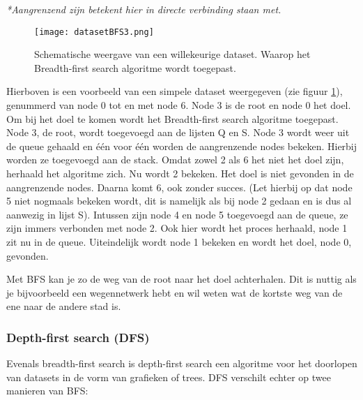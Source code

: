 \textit{*Aangrenzend zijn betekent hier \textit{in directe verbinding staan met}.}

\begin{figure}[h]
  \centering
    \texttt{[image: datasetBFS3.png]}
  \caption{Schematische weergave van een willekeurige dataset. Waarop het Breadth-first search algoritme wordt toegepast.}
  \label{fig:datasetBFS3}
\end{figure}
Hierboven is een voorbeeld van een simpele dataset weergegeven (zie figuur \ref{fig:datasetBFS3}), genummerd van node 0 tot en met node 6. Node 3 is de root en node 0 het doel. Om bij het doel te komen wordt het Breadth-first search algoritme toegepast. Node 3, de root, wordt toegevoegd aan de lijsten Q en S. Node 3 wordt weer uit de queue gehaald en \'e\'en voor \'e\'en worden de aangrenzende nodes bekeken. Hierbij worden ze toegevoegd aan de stack. Omdat zowel 2 als 6 het niet het doel zijn, herhaald het algoritme zich. Nu wordt 2 bekeken. Het doel is niet gevonden in de aangrenzende nodes. Daarna komt 6, ook zonder succes. (Let hierbij op dat node 5 niet nogmaals bekeken wordt, dit is namelijk als bij node 2 gedaan en is dus al aanwezig in lijst S). Intussen zijn node 4 en node 5 toegevoegd aan de queue, ze zijn immers verbonden met node 2. Ook hier wordt het proces herhaald, node 1 zit nu in de queue. Uiteindelijk wordt node 1 bekeken en wordt het doel, node 0, gevonden.

Met BFS kan je zo de weg van de root naar het doel achterhalen. Dit is nuttig als je bijvoorbeeld een wegennetwerk hebt en wil weten wat de kortste weg van de ene naar de andere stad is.


\subsubsection{Depth-first search (DFS)}
Evenals breadth-first search is depth-first search een algoritme voor het doorlopen van datasets in de vorm van grafieken of trees. DFS verschilt echter op twee manieren van BFS:

